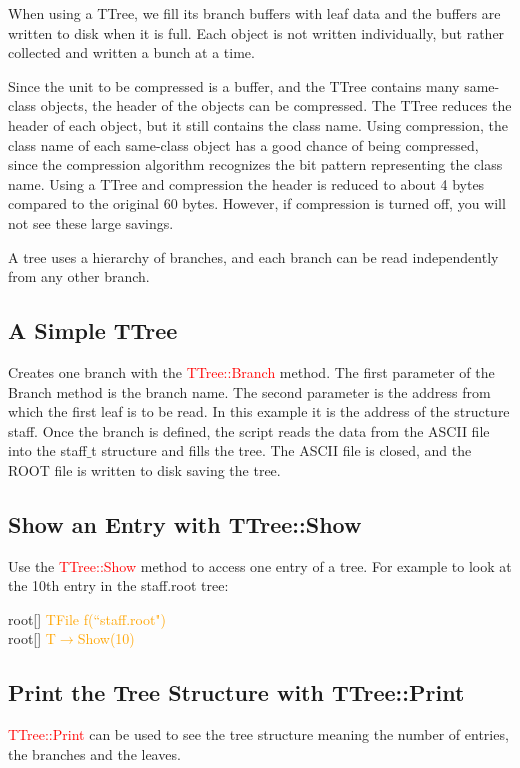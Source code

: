 \documentclass[12pt,a4paper]{article}
\begin{document}
When using a TTree, we fill its branch buffers with leaf data and the buffers are written to disk when it is full. Each object is not written individually, but rather collected and written a bunch at a time.

Since the unit to be compressed is a buffer, and the TTree contains many same-class objects, the header of the objects can be compressed. The TTree reduces the header of each object, but it still contains the class name. Using compression, the class name of each same-class object has a good chance of being compressed, since the compression algorithm recognizes the bit pattern representing the class name. Using a TTree and compression the header is reduced to about 4 bytes compared to the original 60 bytes. However, if compression is turned off, you will not see these large savings.

A tree uses a hierarchy of branches, and each branch can be read independently from any other branch.

\subsection{A Simple TTree}

Creates one branch with the \textcolor{red}{TTree::Branch} method. The first parameter of the Branch method is the branch name. The second parameter is the address from which the first leaf is to be read. In this example it is the address of the structure staff. Once the branch is defined, the script reads the data from the ASCII file into the staff$\_$t structure and fills the tree. The ASCII file is closed, and the ROOT file is written to disk saving the tree. 

\subsection{Show an Entry with TTree::Show}
Use the \textcolor{red}{TTree::Show} method to access one entry of a tree. For example to look at the 10th entry in the staff.root tree:

root[] \textcolor{orange}{TFile f(``staff.root")} \\
root[] \textcolor{orange}{T$\rightarrow$Show(10)}

\subsection{Print the Tree Structure with TTree::Print}

\textcolor{red}{TTree::Print} can be used to see the tree structure meaning the number of entries, the branches and the leaves. 
\end{document}
